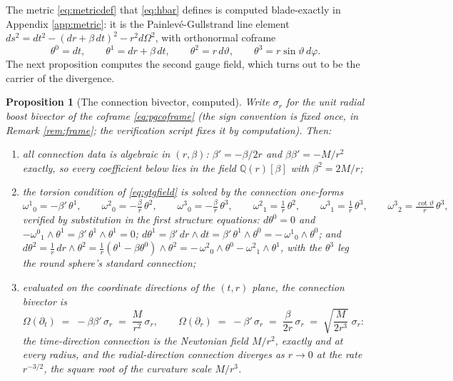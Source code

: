 \documentclass[11pt]{article}
\newtheorem{proposition}[theorem]{Proposition}
\theoremstyle{definition}
\begin{document}
The metric \eqref{eq:metricdef} that \eqref{eq:hbar} defines is computed blade-exactly in Appendix \ref{app:metric}: it is the Painlev\'e-Gullstrand line element $ds^2 = dt^2 - (dr + \beta\,dt)^2 - r^2 d\Omega^2$, with orthonormal coframe
\begin{equation}\label{eq:pgcoframe}
\theta^0 = dt, \qquad \theta^1 = dr + \beta\,dt, \qquad \theta^2 = r\,d\vartheta, \qquad \theta^3 = r\sin\vartheta\,d\varphi .
\end{equation}
The next proposition computes the second gauge field, which turns out to be the carrier of the divergence.

\begin{proposition}[The connection bivector, computed]\label{prop:omega}
Write $\sigma_r$ for the unit radial boost bivector of the coframe \eqref{eq:pgcoframe} (the sign convention is fixed once, in Remark \ref{rem:frame}; the verification script fixes it by computation). Then:
\begin{enumerate}
\item all connection data is algebraic in $(r, \beta)$: $\beta' = -\beta/2r$ and $\beta\beta' = -M/r^2$ exactly, so every coefficient below lies in the field $\mathbb{Q}(r)[\beta]$ with $\beta^2 = 2M/r$;
\item the torsion condition of \eqref{eq:gtgfield} is solved by the connection one-forms
\[
\omega^1{}_0 = -\beta'\,\theta^1, \qquad
\omega^2{}_0 = -\tfrac{\beta}{r}\,\theta^2, \qquad
\omega^3{}_0 = -\tfrac{\beta}{r}\,\theta^3, \qquad
\omega^2{}_1 = \tfrac{1}{r}\,\theta^2, \qquad
\omega^3{}_1 = \tfrac{1}{r}\,\theta^3, \qquad
\omega^3{}_2 = \tfrac{\cot\vartheta}{r}\,\theta^3,
\]
verified by substitution in the first structure equations: $d\theta^0 = 0$ and $-\omega^0{}_1 \wedge \theta^1 = \beta'\,\theta^1 \wedge \theta^1 = 0$; $d\theta^1 = \beta'\,dr\wedge dt = \beta'\,\theta^1\wedge\theta^0 = -\,\omega^1{}_0\wedge\theta^0$; and $d\theta^2 = \tfrac1r\,dr\wedge\theta^2 = \tfrac1r(\theta^1 - \beta\theta^0)\wedge\theta^2 = -\,\omega^2{}_0\wedge\theta^0 - \omega^2{}_1\wedge\theta^1$, with the $\theta^3$ leg the round sphere's standard connection;
\item evaluated on the coordinate directions of the $(t,r)$ plane, the connection bivector is
\[
\Omega(\partial_t) \;=\; -\beta\beta'\,\sigma_r \;=\; \frac{M}{r^2}\,\sigma_r ,
\qquad
\Omega(\partial_r) \;=\; -\beta'\,\sigma_r \;=\; \frac{\beta}{2r}\,\sigma_r \;=\; \sqrt{\frac{M}{2r^3}}\;\sigma_r :
\]
the time-direction connection is the Newtonian field $M/r^2$, exactly and at every radius, and the radial-direction connection diverges as $r \to 0$ at the rate $r^{-3/2}$, the square root of the curvature scale $M/r^3$.
\end{enumerate}
\end{proposition}
\end{document}
